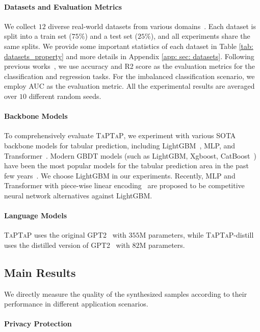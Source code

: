 \paragraph{Datasets and Evaluation Metrics} We collect $12$ diverse real-world datasets from various domains~\citep{UCI,DBLP:journals/sigkdd/openml}. Each dataset is split into a train set ($75$\%) and a test set ($25$\%), and all experiments share the same splits. We provide some important statistics of each dataset in Table \ref{tab: datasets_property} and more details in Appendix \ref{app: sec: datasets}. Following previous works~\citep{why-do-tree, GReaT}, we use accuracy and R2 score as the evaluation metrics for the classification and regression tasks. For the imbalanced classification scenario, we employ AUC as the evaluation metric. All the experimental results are averaged over $10$ different random seeds.

\paragraph{Backbone Models} To comprehensively evaluate \textsc{TaPTaP}, we experiment with various SOTA backbone models for tabular prediction, including LightGBM~\citep{lightgbm}, MLP, and Transformer~\citep{revisiting}. Modern GBDT models (such as LightGBM, Xgboost, CatBoost~\citep{DBLP:conf/nips/CatBoost}) have been the most popular models for the tabular prediction area in the past few years~\citep{revisiting,deeplearning-not}. We choose LightGBM in our experiments. Recently, MLP and Transformer with piece-wise linear encoding~\citep{num_embeddings} are proposed to be competitive neural network alternatives against LightGBM.

\paragraph{Language Models} \textsc{TaPTaP} uses the original GPT2~\citep{GPT2} with $355$M parameters, while \textsc{TaPTaP}-distill uses the distilled version of GPT2~\citep{distilgpt2} with $82$M parameters.

\subsection{Main Results}
\label{sec: main_results}

We directly measure the quality of the synthesized samples according to their performance in different application scenarios.

\paragraph{Privacy Protection}

